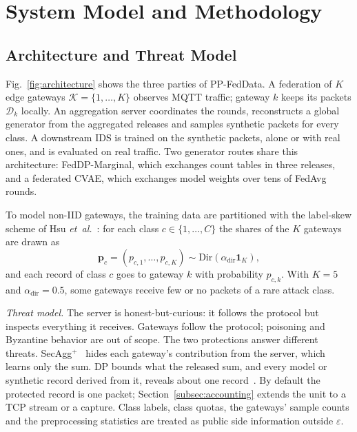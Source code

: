 \documentclass[conference]{IEEEtran}
\begin{document}
\section{System Model and Methodology}\label{sec:methodology}

\subsection{Architecture and Threat Model}\label{subsec:system}
Fig.~\ref{fig:architecture} shows the three parties of PP-FedData. A federation of $K$ edge gateways $\mathcal{K} = \{1, \dots, K\}$ observes MQTT traffic; gateway $k$ keeps its packets $\mathcal{D}_k$ locally. An aggregation server coordinates the rounds, reconstructs a global generator from the aggregated releases and samples synthetic packets for every class. A downstream IDS is trained on the synthetic packets, alone or with real ones, and is evaluated on real traffic. Two generator routes share this architecture: FedDP-Marginal, which exchanges count tables in three releases, and a federated CVAE, which exchanges model weights over tens of FedAvg rounds.

To model non-IID gateways, the training data are partitioned with the label-skew scheme of Hsu \textit{et~al.}~\cite{hsu2019}: for each class $c \in \{1, \dots, C\}$ the shares of the $K$ gateways are drawn as
\begin{equation}
\mathbf{p}_c = (p_{c,1}, \dots, p_{c,K}) \sim \mathrm{Dir}(\alpha_{\mathrm{dir}} \mathbf{1}_K),
\label{eq:dirichlet}
\end{equation}
and each record of class $c$ goes to gateway $k$ with probability $p_{c,k}$. With $K = 5$ and $\alpha_{\mathrm{dir}} = 0.5$, some gateways receive few or no packets of a rare attack class.

\textit{Threat model.} The server is honest-but-curious: it follows the protocol but inspects everything it receives. Gateways follow the protocol; poisoning and Byzantine behavior are out of scope. The two protections answer different threats. SecAgg$^+$~\cite{bell2020} hides each gateway's contribution from the server, which learns only the sum. DP bounds what the released sum, and every model or synthetic record derived from it, reveals about one record~\cite{dwork2014}. By default the protected record is one packet; Section~\ref{subsec:accounting} extends the unit to a TCP stream or a capture. Class labels, class quotas, the gateways' sample counts and the preprocessing statistics are treated as public side information outside $\varepsilon$.
\end{document}

